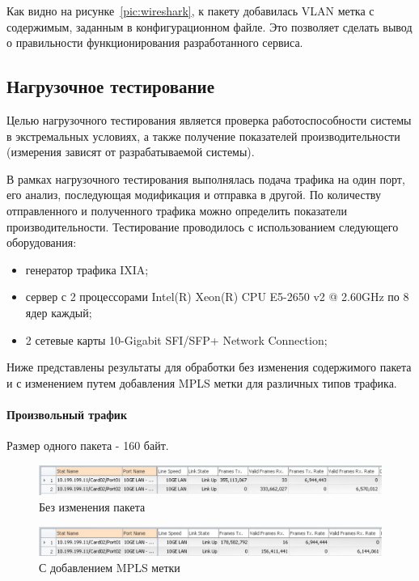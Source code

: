 Как видно на рисунке~\ref{pic:wireshark}, к пакету добавилась VLAN метка с содержимым, заданным в конфигурационном файле. Это позволяет сделать вывод о правильности функционирования разработанного сервиса.

\subsection{Нагрузочное тестирование}
Целью нагрузочного тестирования является проверка работоспособности системы в экстремальных условиях, а также получение показателей производительности (измерения зависят от разрабатываемой системы).

В рамках нагрузочного тестирования выполнялась подача трафика на один порт, его анализ, последующая модификация и отправка в другой. По количеству отправленного и полученного трафика можно определить показатели производительности. Тестирование проводилось с использованием следующего оборудования:
\begin{itemize}
\item генератор трафика IXIA;
\item сервер с 2 процессорами Intel(R) Xeon(R) CPU E5-2650 v2 @ 2.60GHz по 8 ядер каждый;
\item 2 сетевые карты 10-Gigabit SFI/SFP+ Network Connection;
\end{itemize}

Ниже представлены результаты для обработки без изменения содержимого пакета и с изменением путем добавления MPLS метки для различных типов трафика.

\paragraph{Произвольный трафик}

Размер одного пакета - 160 байт. 

\begin{figure}
\centering
\includegraphics[scale=0.6]{pictures/rand_output}
\caption{Без изменения пакета}
\label{pic:rand_output}
\end{figure}

\begin{figure}
\centering
\includegraphics[scale=0.6]{pictures/rand_mpls_output}
\caption{С добавлением MPLS метки}
\label{pic:rand_mpls_output}
\end{figure}

